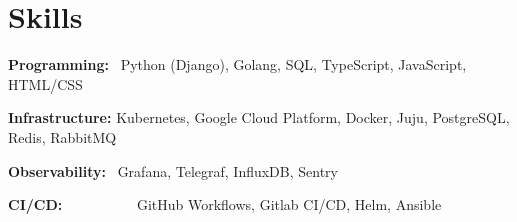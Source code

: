 \documentclass{article}
\begin{document}

\section{Skills}

\textbf{Programming:}~ Python (Django), Golang, SQL, TypeScript, JavaScript, HTML/CSS
\vspace{0.5em}

\textbf{Infrastructure:} Kubernetes, Google Cloud Platform, Docker, Juju, PostgreSQL, Redis, RabbitMQ
\vspace{0.5em}

\textbf{Observability:}~ Grafana, Telegraf, InfluxDB, Sentry
\vspace{0.5em}

\textbf{CI/CD:}~~~~~~~~~~ GitHub Workflows, Gitlab CI/CD, Helm, Ansible
\end{document}
